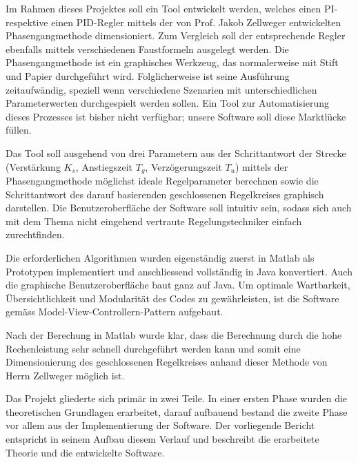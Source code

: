 Im Rahmen dieses Projektes soll ein  Tool entwickelt werden, welches einen PI-  %
respektive einen PID-Regler mittels der von Prof. Jakob Zellweger entwickelten
Phasengangmethode                                                               %
dimensioniert. Zum Vergleich  soll der entsprechende Regler  ebenfalls mittels
verschiedenen  Faustformeln ausgelegt  werden. Die  Phasengangmethode ist  ein
graphisches Werkzeug,  das normalerweise  mit Stift und  Papier durchgef\"uhrt
wird. Folglicherweise  ist seine  Ausf\"uhrung zeitaufw\"andig,  speziell wenn
verschiedene  Szenarien  mit unterschiedlichen  Parameterwerten  durchgespielt
werden sollen. Ein Tool zur Automatisierung  dieses Prozesses ist bisher nicht
verf\"ugbar; unsere Software soll diese Marktl\"ucke f\"ullen.

Das Tool soll ausgehend von drei Parametern aus der Schrittantwort der Strecke  %
(Verst\"arkung  $K_s$, Anstiegszeit  $T_g$, Verz\"ogerungszeit  $T_u$) mittels
der Phasengangmethode  m\"oglichst ideale  Regelparameter berechnen  sowie die
Schrittantwort  des darauf  basierenden  geschlossenen Regelkreises  graphisch
darstellen. Die Benutzeroberfl\"ache  der Software soll intuitiv  sein, sodass
sich auch mit  dem Thema nicht eingehend  vertraute Regelungstechniker einfach
zurechtfinden.

Die  erforderlichen   Algorithmen  wurden  eigenst\"andig  zuerst   in  Matlab %
als  Prototypen   implementiert  und   anschliessend  vollst\"andig   in  Java
konvertiert. Auch die  graphische Benutzeroberfl\"ache baut ganz  auf Java. Um
optimale  Wartbarkeit,  \"Ubersichtlichkeit  und Modularit\"at  des  Codes  zu
gew\"ahrleisten,  ist  die  Software  gem\"ass  Model-View-Controllern-Pattern
aufgebaut.

Nach  der Berechung  in  Matlab  wurde klar,  dass  die  Berechnung durch  die %
hohe Rechenleistung  sehr schnell  durchgef\"uhrt werden  kann und  somit eine
Dimensionierung des geschlossenen Regelkreises anhand dieser Methode von Herrn
Zellweger m\"oglich ist.

Das  Projekt gliederte  sich prim\"ar  in  zwei Teile. In  einer ersten  Phase %
wurden  die  theoretischen  Grundlagen erarbeitet,  darauf  aufbauend  bestand
die  zweite  Phase  vor  allem   aus  der  Implementierung  der  Software. Der
vorliegende Bericht entspricht in seinem  Aufbau diesem Verlauf und beschreibt
die erarbeitete Theorie und die entwickelte Software.
